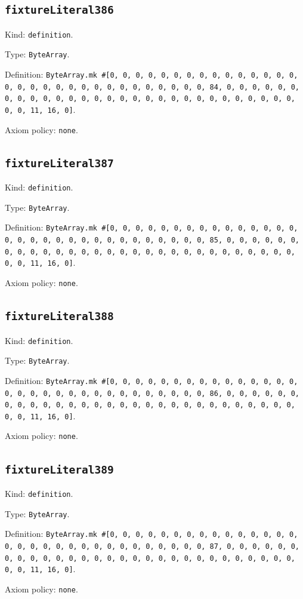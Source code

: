 \documentclass[11pt]{article}
\begin{document}
\subsection*{\texttt{fixtureLiteral386}}
\noindent Kind: \texttt{definition}.\par
\noindent Type: \texttt{ByteArray}.\par
\noindent Definition: \texttt{ByteArray.mk \#[0, 0, 0, 0, 0, 0, 0, 0, 0, 0, 0, 0, 0, 0, 0, 0, 0, 0, 0, 0, 0, 0, 0, 0, 0, 0, 0, 0, 0, 0, 0, 84, 0, 0, 0, 0, 0, 0, 0, 0, 0, 0, 0, 0, 0, 0, 0, 0, 0, 0, 0, 0, 0, 0, 0, 0, 0, 0, 0, 0, 0, 0, 0, 11, 16, 0]}.\par
\noindent Axiom policy: \texttt{none}.\par
\subsection*{\texttt{fixtureLiteral387}}
\noindent Kind: \texttt{definition}.\par
\noindent Type: \texttt{ByteArray}.\par
\noindent Definition: \texttt{ByteArray.mk \#[0, 0, 0, 0, 0, 0, 0, 0, 0, 0, 0, 0, 0, 0, 0, 0, 0, 0, 0, 0, 0, 0, 0, 0, 0, 0, 0, 0, 0, 0, 0, 85, 0, 0, 0, 0, 0, 0, 0, 0, 0, 0, 0, 0, 0, 0, 0, 0, 0, 0, 0, 0, 0, 0, 0, 0, 0, 0, 0, 0, 0, 0, 0, 11, 16, 0]}.\par
\noindent Axiom policy: \texttt{none}.\par
\subsection*{\texttt{fixtureLiteral388}}
\noindent Kind: \texttt{definition}.\par
\noindent Type: \texttt{ByteArray}.\par
\noindent Definition: \texttt{ByteArray.mk \#[0, 0, 0, 0, 0, 0, 0, 0, 0, 0, 0, 0, 0, 0, 0, 0, 0, 0, 0, 0, 0, 0, 0, 0, 0, 0, 0, 0, 0, 0, 0, 86, 0, 0, 0, 0, 0, 0, 0, 0, 0, 0, 0, 0, 0, 0, 0, 0, 0, 0, 0, 0, 0, 0, 0, 0, 0, 0, 0, 0, 0, 0, 0, 11, 16, 0]}.\par
\noindent Axiom policy: \texttt{none}.\par
\subsection*{\texttt{fixtureLiteral389}}
\noindent Kind: \texttt{definition}.\par
\noindent Type: \texttt{ByteArray}.\par
\noindent Definition: \texttt{ByteArray.mk \#[0, 0, 0, 0, 0, 0, 0, 0, 0, 0, 0, 0, 0, 0, 0, 0, 0, 0, 0, 0, 0, 0, 0, 0, 0, 0, 0, 0, 0, 0, 0, 87, 0, 0, 0, 0, 0, 0, 0, 0, 0, 0, 0, 0, 0, 0, 0, 0, 0, 0, 0, 0, 0, 0, 0, 0, 0, 0, 0, 0, 0, 0, 0, 11, 16, 0]}.\par
\noindent Axiom policy: \texttt{none}.\par
\end{document}
